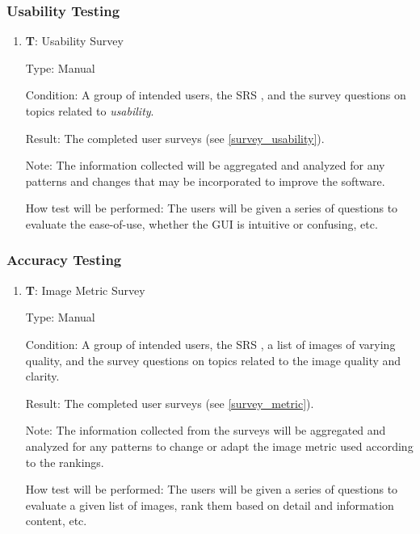 \documentclass[12pt, titlepage]{article}
\newcounter{testnum} %
\begin{document}
\subsubsection{Usability Testing}
\begin{enumerate}

  \item{\textbf{T\thetestnum \label{T_surveyUsability}}: Usability Survey\\}

  Type: Manual
            
  Condition: A group of intended users, the SRS \citep{SRS}, and 
  the survey questions on topics related to \textit{usability}.
            
  Result: The completed user surveys (see \ref{survey_usability}).

  Note: The information collected will be aggregated and analyzed for any patterns and changes
    that may be incorporated to improve the software.
            
  How test will be performed: The users will be given a series of questions to evaluate the 
    ease-of-use, whether the GUI is intuitive or confusing, etc.

\end{enumerate}

\subsubsection{Accuracy Testing}
\begin{enumerate}

  \item{\textbf{T\thetestnum \label{T_surveyMetric}}: Image Metric Survey\\}

  Type: Manual
            
  Condition: A group of intended users, the SRS \citep{SRS}, 
  a list of images of varying quality, and the survey questions on topics related 
  to the image quality and clarity.
            
  Result: The completed user surveys (see \ref{survey_metric}).

  Note: The information collected from the surveys
    will be aggregated and analyzed for any patterns to
    change or adapt the image metric used according to the rankings.
            
  How test will be performed: The users will be given a series of questions to evaluate 
    a given list of images, rank them based on detail and information content, etc.
  
\end{enumerate}
\end{document}
